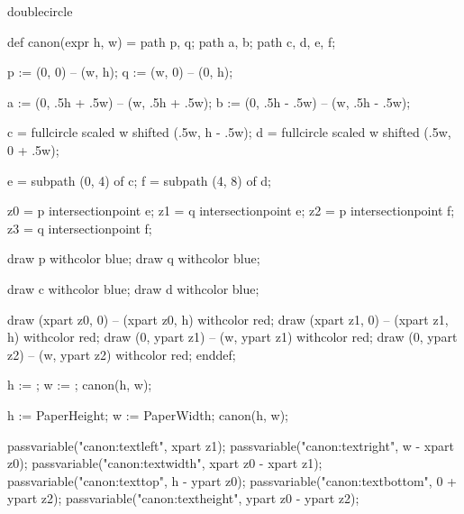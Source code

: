 

\startenvironment doublecircle

	\setuppagenumbering[alternative=singlesided]

	\startMPdefinitions
		def canon(expr h, w) =
			path p, q;
			path a, b;
			path c, d, e, f;

			p := (0, 0) -- (w, h);
			q := (w, 0) -- (0, h);

			a := (0, .5h + .5w) -- (w, .5h + .5w); %
			b := (0, .5h - .5w) -- (w, .5h - .5w); %

			c = fullcircle scaled w shifted (.5w, h - .5w); %
			d = fullcircle scaled w shifted (.5w, 0 + .5w); %

			e = subpath (0, 4) of c; %
			f = subpath (4, 8) of d; %

			z0 = p intersectionpoint e; %
			z1 = q intersectionpoint e; %
			z2 = p intersectionpoint f; %
			z3 = q intersectionpoint f; %

			draw p withcolor blue;
			draw q withcolor blue;

			draw c withcolor blue;
			draw d withcolor blue;

			draw (xpart z0, 0) -- (xpart z0, h) withcolor red; %
			draw (xpart z1, 0) -- (xpart z1, h) withcolor red; %
			draw (0, ypart z1) -- (w, ypart z1) withcolor red; %
			draw (0, ypart z2) -- (w, ypart z2) withcolor red; %
		enddef;
	\stopMPdefinitions

		h := \overlayheight;
		w := \overlaywidth;
		canon(h, w);
	\stopreusableMPgraphic

	\startmode[debug]
		\setupbackgrounds[rightpage][background=canon]
	\stopmode

	\startMPcalculation
		h := PaperHeight;
		w := PaperWidth;
		canon(h, w);

		passvariable("canon:textleft",   xpart z1);
		passvariable("canon:textright",  w - xpart z0);
		passvariable("canon:textwidth",  xpart z0 - xpart z1);
		passvariable("canon:texttop",    h - ypart z0);
		passvariable("canon:textbottom", 0 + ypart z2);
		passvariable("canon:textheight", ypart z0 - ypart z2);
	\stopMPcalculation

	\setuplayout[
		header=\bodyfontsize,
		headerdistance=\bodyfontsize, %
		top=0pt,
		topspace=\dimexpr\MPrunvar{canon:texttop}bp-\headerheight-\headerdistance\relax,
		footer=0pt,
		footerdistance=0pt,
		height=\dimexpr\MPrunvar{canon:textheight}bp
			+\headerheight+\headerdistance
			+\footerheight+\footerdistance\relax,
		backspace=\MPrunvar{canon:textleft}bp,
		margin=0pt, %
		width=\MPrunvar{canon:textwidth}bp,
	]

\stopenvironment

